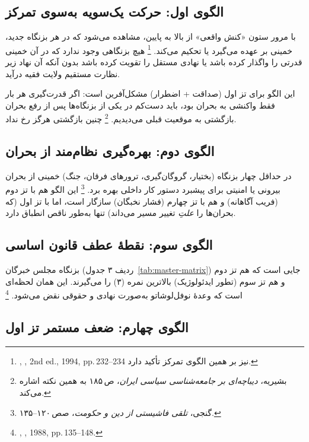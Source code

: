 \subsection{الگوی اول: حرکت یک‌سویه به‌سوی تمرکز}

با مرور ستون «کنش واقعی» از بالا به پایین،
مشاهده می‌شود که در هر بزنگاه جدید،
خمینی  بر‌ عهده می‌گیرد یا تحکیم می‌کند.%
\footnote{%
,
\textit{},
2nd ed., 1994, pp.\,232–234
نیز بر همین الگوی تمرکز تأکید دارد.}
هیچ بزنگاهی وجود ندارد که در آن خمینی قدرتی را واگذار کرده باشد
یا نهادی مستقل را تقویت کرده باشد بدون آنکه آن نهاد
زیر نظارت مستقیم ولایت فقیه درآید.

این الگو برای
\textcolor{cGreen}{تز اول (صداقت + اضطرار)}
مشکل‌آفرین است:
اگر قدرت‌گیری هر بار فقط واکنشی به بحران بود،
باید دست‌کم در یکی از بزنگاه‌ها پس از رفع بحران
بازگشتی به موقعیت قبلی می‌دیدیم.%
\footnote{%
بشیریه، \textit{دیباچه‌ای بر جامعه‌شناسی سیاسی ایران}، ص\,۱۸۵
به همین نکته اشاره می‌کند.}
چنین بازگشتی هرگز رخ نداد.

\subsection{الگوی دوم: بهره‌گیری نظام‌مند از بحران}

در حداقل چهار بزنگاه
(بختیار، گروگان‌گیری، ترورهای فرقان، جنگ)
خمینی از بحران بیرونی یا امنیتی
برای پیشبرد دستور کار داخلی بهره برد.%
\footnote{گنجی، \textit{تلقی فاشیستی از دین و حکومت}، صص\,۱۲۰–۱۳۵.}
این الگو هم با \textcolor{cAccent}{تز دوم (فریب آگاهانه)} و
هم با \textcolor{cConsolid}{تز چهارم (فشار نخبگان)} سازگار است،
اما با تز اول (که بحران‌ها را \emph{علتِ} تغییر مسیر می‌داند)
تنها به‌طور ناقص انطباق دارد.

\subsection{الگوی سوم: نقطهٔ عطف قانون اساسی}

بزنگاه مجلس خبرگان
(ردیف ۳ جدول~\ref{tab:master-matrix})
جایی است که هم \textcolor{cAccent}{تز دوم} و هم
\textcolor{cGold}{تز سوم (تطور ایدئولوژیک)}
بالاترین نمره (۳) را می‌گیرند.
این همان لحظه‌ای است که وعدهٔ نوفل‌لوشاتو
به‌صورت نهادی و حقوقی نقض می‌شود.%
\footnote{%
,
\textit{}, 1988, pp.\,135–148.}

\subsection{الگوی چهارم: ضعف مستمر تز اول}

